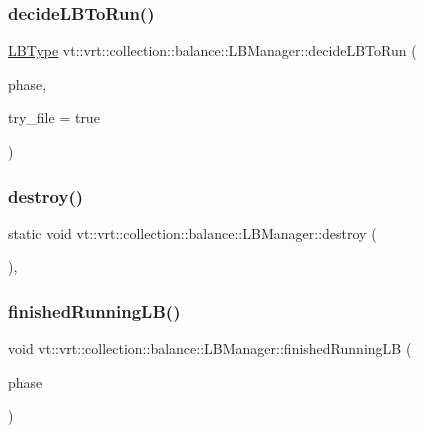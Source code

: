 \subsubsection{\texorpdfstring{decide\+L\+B\+To\+Run()}{decideLBToRun()}}
{\footnotesize\ttfamily \hyperlink{namespacevt_1_1vrt_1_1collection_1_1balance_ac4f99693509affcc67db182d4aad9b5c}{L\+B\+Type} vt\+::vrt\+::collection\+::balance\+::\+L\+B\+Manager\+::decide\+L\+B\+To\+Run (\begin{DoxyParamCaption}\item[{\hyperlink{namespacevt_a46ce6733d5cdbd735d561b7b4029f6d7}{Phase\+Type}}]{phase,  }\item[{bool}]{try\+\_\+file = {\ttfamily true} }\end{DoxyParamCaption})}

\mbox{\label{structvt_1_1vrt_1_1collection_1_1balance_1_1_l_b_manager_a2cb851831494ddc59c0e4f12d845a884}} 
\subsubsection{\texorpdfstring{destroy()}{destroy()}}
{\footnotesize\ttfamily static void vt\+::vrt\+::collection\+::balance\+::\+L\+B\+Manager\+::destroy (\begin{DoxyParamCaption}{ }\end{DoxyParamCaption})\hspace{0.3cm}{\ttfamily [inline]}, {\ttfamily [static]}}

\mbox{\label{structvt_1_1vrt_1_1collection_1_1balance_1_1_l_b_manager_af78c27f2e951e965e287273461ad1d3e}} 
\subsubsection{\texorpdfstring{finished\+Running\+L\+B()}{finishedRunningLB()}}
{\footnotesize\ttfamily void vt\+::vrt\+::collection\+::balance\+::\+L\+B\+Manager\+::finished\+Running\+LB (\begin{DoxyParamCaption}\item[{\hyperlink{namespacevt_a46ce6733d5cdbd735d561b7b4029f6d7}{Phase\+Type}}]{phase }\end{DoxyParamCaption})\hspace{0.3cm}{\ttfamily [static]}}

